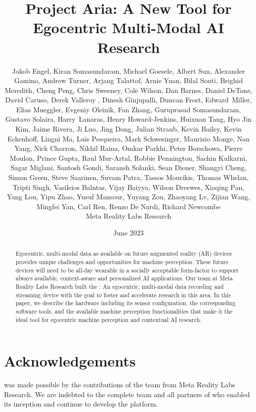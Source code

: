 \documentclass[10pt,twocolumn,letterpaper]{article}
\title{Project Aria: A New Tool for Egocentric Multi-Modal AI Research}
\author{{Jakob Engel, Kiran Somasundaram, Michael Goesele, Albert Sun, Alexander Gamino, Andrew Turner, Arjang Talattof, Arnie Yuan, Bilal Souti, Brighid Meredith, Cheng Peng, Chris Sweeney, Cole Wilson, Dan Barnes, Daniel DeTone, David Caruso, Derek Valleroy , Dinesh Ginjupalli, Duncan Frost, Edward~Miller, Elias Mueggler, Evgeniy Oleinik, Fan Zhang, Guruprasad Somasundaram, Gustavo Solaira, Harry~Lanaras, Henry Howard-Jenkins, Huixuan Tang, Hyo Jin Kim, Jaime Rivera, Ji Luo, Jing Dong, Julian Straub, Kevin Bailey, Kevin Eckenhoff, Lingni Ma, Luis Pesqueira, Mark Schwesinger, Maurizio Monge, Nan Yang, Nick Charron, Nikhil Raina, Omkar Parkhi, Peter Borschowa, Pierre Moulon, Prince Gupta, Raul Mur-Artal, Robbie Pennington, Sachin Kulkarni, Sagar Miglani, Santosh Gondi, Saransh Solanki, Sean Diener, Shangyi Cheng, Simon Green, Steve Saarinen, Suvam Patra, Tassos Mourikis, Thomas Whelan, Tripti Singh, Vasileios Balntas, Vijay Baiyya, Wilson Dreewes, Xiaqing Pan, Yang Lou, Yipu Zhao, Yusuf Mansour, Yuyang Zou, Zhaoyang Lv, Zijian Wang, Mingfei Yan, Carl Ren, Renzo De Nardi, Richard Newcombe}\\[2mm]
Meta Reality Labs Research}
\date{June 2023}
\begin{document}
\maketitle

\begin{abstract}
   Egocentric, multi-modal data as available on future augmented reality (AR) devices provides unique challenges and opportunities for machine perception. These future devices will need to be all-day wearable in a socially acceptable form-factor to support always available, context-aware and personalized AI applications. Our team at Meta Reality Labs Research built the \AriaDevice: An egocentric, multi-modal data recording and streaming device with the goal to foster and accelerate research in this area. In this paper, we describe the \AriaDevice{} hardware including its sensor configuration, the corresponding software tools, and the available machine perception functionalities that make it the ideal tool for egocentric machine perception and contextual AI research.
\end{abstract}















\section*{Acknowledgements}

\ProjectAria{} was made possible by the contributions of the \ProjectAria{} team from Meta Reality Labs Research. We are indebted to the complete team and all partners of \ProjectAria{} who enabled its inception and continue to develop the platform.


\end{document}
